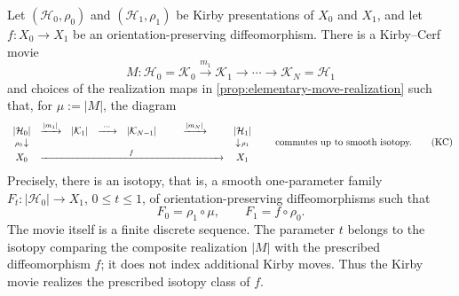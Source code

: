 \begin{theorem}
\label{prop:handle-movie-completeness}
Let \((\mathcal H_0,\rho_0)\) and \((\mathcal H_1,\rho_1)\) be Kirby
presentations of \(X_0\) and \(X_1\), and let
\(f\colon X_0\to X_1\) be an orientation-preserving diffeomorphism.  There
is a Kirby--Cerf movie
\[
  M\colon\mathcal H_0=\mathcal K_0
  \xrightarrow{m_1}\mathcal K_1
  \longrightarrow\cdots\longrightarrow
  \mathcal K_N=\mathcal H_1
\]
and choices of the realization maps in
\cref{prop:elementary-move-realization} such that, for
\(\mu:=|M|\),
the diagram
\begin{equation*}
\label{eq:cerf-realizes-diffeomorphism}
\begin{array}{ccccccc}
  |\mathcal H_0| & \xrightarrow{|m_1|} & |\mathcal K_1|
    & \xrightarrow{\ \cdots\ } & |\mathcal K_{N-1}|
    & \xrightarrow{|m_N|} & |\mathcal H_1| \\
  {\scriptstyle\rho_0}\!\downarrow &&&&&&
    \downarrow\!{\scriptstyle\rho_1} \\
  X_0 & \multicolumn{5}{c}{\xrightarrow{\hspace{9em} f\hspace{9em}}} & X_1
\end{array}
\qquad\text{commutes up to smooth isotopy.}
\tag{KC}
\end{equation*}
Precisely, there is an isotopy, that is, a smooth one-parameter family
\(F_t\colon|\mathcal H_0|\to X_1\), \(0\leq t\leq1\), of
orientation-preserving diffeomorphisms such that
\[
  F_0=\rho_1\circ\mu,
  \qquad
  F_1=f\circ\rho_0.
\]
The movie itself is a finite discrete sequence.  The parameter \(t\) belongs
to the isotopy comparing the composite realization \(|M|\) with the
prescribed diffeomorphism \(f\); it does not index additional Kirby moves.
Thus the Kirby movie realizes the prescribed isotopy class of \(f\).
\end{theorem}

